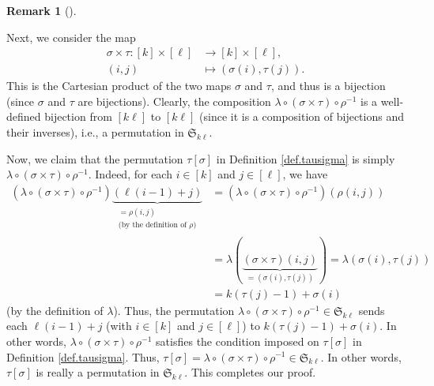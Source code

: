 \documentclass[numbers=enddot,12pt,final,onecolumn,notitlepage]{scrartcl}%
\theoremstyle{definition}
\newtheorem{remk}[theo]{Remark}
\newenvironment{remark}[1][]
{\begin{remk}[#1]\begin{leftbar}}
{\end{leftbar}\end{remk}}
\begin{document}
\begin{remark}
Next, we consider the map%
\begin{align*}
\sigma\times\tau:\left[  k\right]  \times\left[  \ell\right]   &
\rightarrow\left[  k\right]  \times\left[  \ell\right]  ,\\
\left(  i,j\right)   &  \mapsto\left(  \sigma\left(  i\right)  ,\tau\left(
j\right)  \right)  .
\end{align*}
This is the Cartesian product of the two maps $\sigma$ and $\tau$, and thus is
a bijection (since $\sigma$ and $\tau$ are bijections). Clearly, the
composition $\lambda\circ\left(  \sigma\times\tau\right)  \circ\rho^{-1}$ is a
well-defined bijection from $\left[  k\ell\right]  $ to $\left[  k\ell\right]
$ (since it is a composition of bijections and their inverses), i.e., a
permutation in $\mathfrak{S}_{k\ell}$.

Now, we claim that the permutation $\tau\left[  \sigma\right]  $ in Definition
\ref{def.tausigma} is simply $\lambda\circ\left(  \sigma\times\tau\right)
\circ\rho^{-1}$. Indeed, for each $i\in\left[  k\right]  $ and $j\in\left[
\ell\right]  $, we have%
\begin{align*}
\left(  \lambda\circ\left(  \sigma\times\tau\right)  \circ\rho^{-1}\right)
\underbrace{\left(  \ell\left(  i-1\right)  +j\right)  }_{\substack{=\rho
\left(  i,j\right)  \\\text{(by the definition of }\rho\text{)}}}  &  =\left(
\lambda\circ\left(  \sigma\times\tau\right)  \circ\rho^{-1}\right)  \left(
\rho\left(  i,j\right)  \right) \\
&  =\lambda\left(  \underbrace{\left(  \sigma\times\tau\right)  \left(
i,j\right)  }_{=\left(  \sigma\left(  i\right)  ,\tau\left(  j\right)
\right)  }\right)  =\lambda\left(  \sigma\left(  i\right)  ,\tau\left(
j\right)  \right) \\
&  =k\left(  \tau\left(  j\right)  -1\right)  +\sigma\left(  i\right)
\end{align*}
(by the definition of $\lambda$). Thus, the permutation $\lambda\circ\left(
\sigma\times\tau\right)  \circ\rho^{-1}\in\mathfrak{S}_{k\ell}$ sends each
$\ell\left(  i-1\right)  +j$ (with $i\in\left[  k\right]  $ and $j\in\left[
\ell\right]  $) to $k\left(  \tau\left(  j\right)  -1\right)  +\sigma\left(
i\right)  $. In other words, $\lambda\circ\left(  \sigma\times\tau\right)
\circ\rho^{-1}$ satisfies the condition imposed on $\tau\left[  \sigma\right]
$ in Definition \ref{def.tausigma}. Thus, $\tau\left[  \sigma\right]
=\lambda\circ\left(  \sigma\times\tau\right)  \circ\rho^{-1}\in\mathfrak{S}%
_{k\ell}$. In other words, $\tau\left[  \sigma\right]  $ is really a
permutation in $\mathfrak{S}_{k\ell}$. This completes our proof.
\end{remark}
\end{document}
